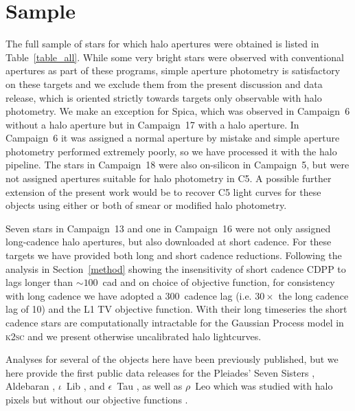 \documentclass[modern]{aastex62}
\begin{document}
\section{Sample}
\label{sec:sample}


The full sample of stars for which halo apertures were obtained is listed in Table~\ref{table_all}. While some very bright stars were observed with conventional apertures as part of these programs, simple aperture photometry is satisfactory on these targets and we exclude them from the present discussion and data release, which is oriented strictly towards targets only observable with halo photometry. 
We make an exception for Spica, which was observed in Campaign~6 without a halo aperture but in Campaign~17 with a halo aperture. In Campaign~6 it was assigned a normal aperture by mistake and simple aperture photometry performed extremely poorly, so we have processed it with the halo pipeline. The stars in Campaign~18 were also on-silicon in Campaign~5, but were not assigned apertures suitable for halo photometry in C5. A possible further extension of the present work would be to recover C5 light curves for these objects using either or both of smear or modified halo photometry.

Seven stars in Campaign~13 and one in Campaign~16 were not only assigned long-cadence halo apertures, but also downloaded at short cadence. For these targets we have provided both long and short cadence reductions. Following the analysis in Section~\ref{method} showing the insensitivity of short cadence CDPP to lags longer than $\sim 100$~cad and on choice of objective function, for consistency with long cadence we have adopted a 300~cadence lag (i.e. $30 \times$ the long cadence lag of 10) and the L1 TV objective function. With their long timeseries the short cadence stars are computationally intractable for the Gaussian Process model in \textsc{k2sc} and we present otherwise uncalibrated halo lightcurves.



Analyses for several of the objects here have been previously published, but we here provide the first public data releases for the Pleiades' Seven Sisters \citep{White2017}, Aldebaran \citep{Farr2018}, $\iota$~Lib \citep{Buysschaert2018}, and $\epsilon$~Tau \citep{Arentoft2019}, as well as $\rho$~Leo which was studied with halo pixels but without our objective functions \citep{Aerts2018}.
\end{document}
